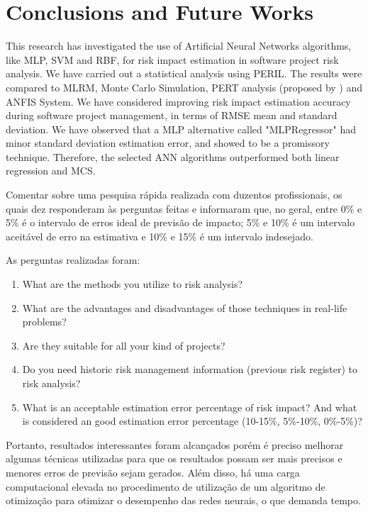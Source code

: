 \chapter{Conclusions and Future Works}\label{cap:conclusion}

This research has investigated the use of Artificial Neural Networks algorithms, like MLP, SVM and RBF, for risk impact estimation in software project risk analysis. We have carried out a statistical analysis using PERIL. The results were compared to MLRM, Monte Carlo Simulation, PERT analysis (proposed by \cite{PMBOK2008}) and ANFIS System. We have considered improving risk impact estimation accuracy during software project management, in terms of RMSE mean and standard deviation. We have observed that a MLP alternative called "MLPRegressor" had minor standard deviation estimation error, and showed to be a promissory technique. Therefore, the selected ANN algorithms outperformed both linear regression and MCS.


Comentar sobre uma pesquisa rápida realizada com duzentos profissionais, os quais dez responderam às perguntas feitas e informaram que, no geral, entre 0\% e 5\% é o intervalo de erros ideal de previsão de impacto; 5\% e 10\% é um intervalo aceitável de erro na estimativa e 10\% e 15\% é um intervalo indesejado.

As perguntas realizadas foram:
\begin{enumerate}
\item What are the methods you utilize to risk analysis?
\item What are the advantages and disadvantages of those techniques in real-life problems?
\item Are they suitable for all your kind of projects?
\item Do you need historic risk management information (previous risk register) to risk analysis?
\item What is an acceptable estimation error percentage of risk impact? And what is considered an good estimation error percentage (10-15\%, 5\%-10\%, 0\%-5\%)?
\end{enumerate}

Portanto, resultados interessantes foram alcançados porém é preciso melhorar algumas técnicas utilizadas para que os resultados possam ser mais precisos e menores erros de previsão sejam gerados. Além disso, há uma carga computacional elevada no procedimento de utilização de um algoritmo de otimização para otimizar o desempenho das redes neurais, o que demanda tempo.

